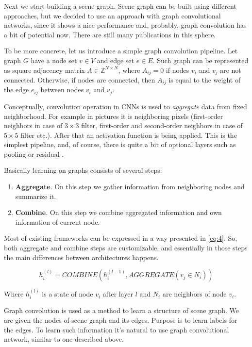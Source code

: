 Next we start building a scene graph. Scene graph can be built using different approaches, but we decided to use an approach with graph convolutional networks, since it shows a nice performance and, probably, graph convolution has a bit of potential now. There are still many publications in this sphere.

To be more concrete, let us introduce a simple graph convolution pipeline. Let graph $G$ have a node set $v\in V$ and edge set $e\in E$. Such graph can be represented as square adjacency matrix $A\in \mathbb{Z}^{N\times N}$, where $A_{ij}=0$ if nodes $v_i$ and $v_j$ are not connected. Otherwise, if nodes are connected, then $A_{ij}$ is equal to the weight of the edge $e_{ij}$ between nodes $v_i$ and $v_j$.

Conceptually, convolution operation in CNNs is used to \textit{aggregate} data from fixed neighborhood. For example in pictures it is neighboring pixels (first-order neighbors in case of $3\times 3$ filter, first-order and second-order neighbors in case of $5\times 5$ filter etc.). After that an activation function is being applied. This is the simplest pipeline, and, of course, there is quite a bit of optional layers such as pooling or residual \cite{He_Zhang_Ren_Sun_2015}.

Basically learning on graphs consists of several steps:

\begin{enumerate}
    \item \textbf{Aggregate}. On this step we gather information from neighboring nodes and summarize it.
    \item \textbf{Combine}. On this step we combine aggregated information and own information of current node.
\end{enumerate}

Most of existing frameworks can be expressed in a way presented in \ref{eq:4}. So, both aggregate and combine steps are customizable, and essentially in those steps the main differences between architectures happens.

\begin{equation}
    \label{eq:4}
    h_i^{(l)}=COMBINE(h_i^{(l-1)}, AGGREGATE(v_j\in N_i))
\end{equation}

Where $h_i^{(l)}$ is a state of node $v_i$ after layer $l$ and $N_i$ are neighbors of node $v_i$.

Graph convolution is used as a method to learn a structure of scene graph. We are given the nodes of scene graph and its edges. Purpose is to learn labels for the edges. To learn such information it's natural to use graph convolutional network, similar to one described above.

